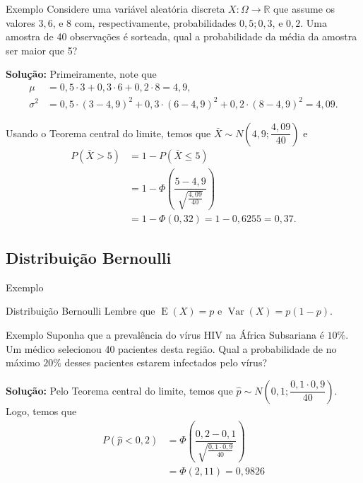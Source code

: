 \documentclass[9pt]{beamer}
\DeclareMathOperator{\espe}{E}
\DeclareMathOperator{\vari}{Var}
\begin{document}
\begin{frame}{Exemplo}
Considere uma variável aleatória discreta $X: \Omega \rightarrow \mathbb{R}$ que assume os valores $3, 6$, e $8$ com, respectivamente, probabilidades $0,5; 0,3$, e $0,2$. Uma amostra de 40 observações é 
sorteada, qual a probabilidade da média da amostra ser maior que 5?
\vfill

\textbf{Solução:} Primeiramente, note que
\begin{align*}
 \mu &= 0,5 \cdot 3 + 0,3 \cdot 6 + 0,2 \cdot 8 = 4,9,\\
 \sigma^2 &= 0,5 \cdot (3 - 4,9)^2 + 0,3 \cdot (6 - 4,9)^2 + 0,2 \cdot (8 - 4,9)^2 = 4,09.
\end{align*}

Usando o Teorema central do limite, temos que $\bar{X} \sim N\left(4,9; \dfrac{4,09}{40}\right)$ e 
\begin{align*}
 P(\bar{X} > 5) &=1-  P(\bar{X} \leq 5)\\
 &=1- \Phi \left( \dfrac{5 - 4,9}{\sqrt{ \frac{4,09}{40} }} \right)\\
 &= 1 - \Phi(0,32) = 1-0,6255=0,37.
\end{align*}

 
\end{frame}


\subsection{Distribuição Bernoulli}

\begin{frame}{Exemplo}
\begin{block}{Distribuição Bernoulli}
 Lembre que $\espe (X) = p$ e $\vari(X) = p(1-p)$.
\end{block}

\begin{block}{Exemplo}
 Suponha que a prevalência do vírus HIV na África Subsariana é $10\%$. Um médico selecionou 40 pacientes desta região. Qual a probabilidade de no máximo $20\%$ desses pacientes estarem infectados pelo vírus?
 \vfill
 
 \textbf{Solução:}  Pelo Teorema central do limite, temos que $\hat{p}  \sim N\left(0,1; \dfrac{0,1\cdot 0,9}{40}\right)$. Logo, temos que
 \begin{align*}
  P(\hat{p} < 0,2) &= \Phi \left(\dfrac{0,2 - 0,1}{ \sqrt{ \frac{0,1 \cdot 0,9}{40} } }\right) \\
  &= \Phi( 2,11)=0,9826
 \end{align*}

\end{block}

 
\end{frame}
\end{document}

